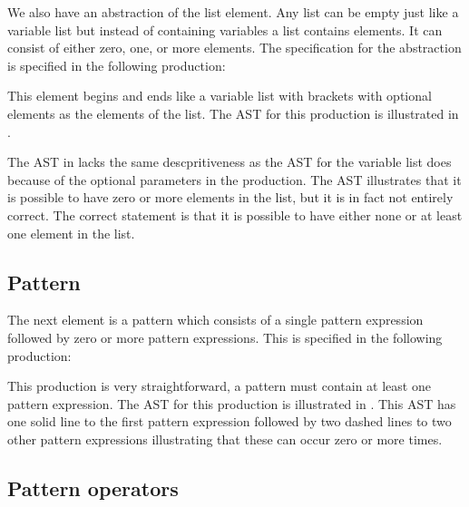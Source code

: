 We also have an abstraction of the list element. Any list can be empty just like a variable list but instead of containing variables a list contains elements. It can consist of either zero, one, or more elements. The specification for the abstraction is specified in the following production:

\begin{ebnf}
\end{ebnf}


This element begins and ends like a variable list with brackets with optional elements as the elements of the list. The AST for this production is illustrated in .



The AST in  lacks the same descpritiveness as the AST for the variable list does because of the optional parameters in the production. The AST illustrates that it is possible to have zero or more elements in the list, but it is in fact not entirely correct. The correct statement is that it is possible to have either none or at least one element in the list.

\subsection{Pattern}

The next element is a pattern which consists of a single pattern expression followed by zero or more pattern expressions. This is specified in the following production:

\begin{ebnf}
\end{ebnf}

This production is very straightforward, a pattern must contain at least one pattern expression. The AST for this production is illustrated in . This AST has one solid line to the first pattern expression followed by two dashed lines to two other pattern expressions illustrating that these can occur zero or more times.



\subsection{Pattern operators}

